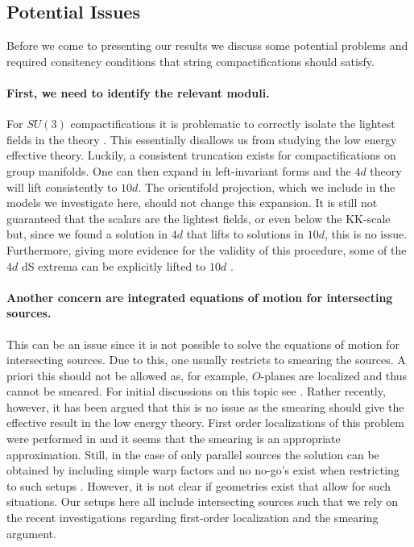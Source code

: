 \documentclass[12pt]{report}
\begin{document}
\subsection{Potential Issues}
\label{sec:stringrequ}
Before we come to presenting our results we discuss some potential problems and required consitency conditions that string compactifications should satisfy.
\paragraph{First, we need to identify the relevant moduli.} For $SU(3)$ compactifications it is problematic to correctly isolate the lightest fields in the theory \cite{Kashani-Poor:2006ofe,Kashani-Poor:2007nby}. This essentially disallows us from studying the low energy effective theory. Luckily, a consistent truncation exists \cite{Cassani:2009ck} for compactifications on group manifolds. One can then expand in left-invariant forms and the $4d$ theory will lift consistently to $10d$. The orientifold projection, which we include in the models we investigate here, should not change this expansion. It is still not guaranteed that the scalars are the lightest fields, or even below the KK-scale \cite{Andriot:2018wzk} but, since we found a solution in $4d$ that lifts to solutions in $10d$, this is no issue. Furthermore, giving more evidence for the validity of this procedure, some of the $4d$ dS extrema can be explicitly lifted to $10d$ \cite{Danielsson:2010bc}.
\paragraph{Another concern are integrated equations of motion for intersecting sources.} This can be an issue since it is not possible to solve the equations of motion for intersecting sources. Due to this, one usually restricts to smearing the sources. A priori this should not be allowed as, for example, $O$-planes are localized and thus cannot be smeared. For initial discussions on this topic see \cite{Douglas:2010rt,Blaback:2010sj,Blaback:2011nz,Blaback:2011pn,Saracco:2012wc,McOrist:2012yc}. Rather recently, however, it has been argued that this is no issue as the smearing should give the effective result in the low energy theory. First order localizations of this problem were performed in \cite{Junghans:2020acz,Marchesano:2020qvg,Cribiori:2021djm} and it seems that the smearing is an appropriate approximation. Still, in the case of only parallel sources the solution can be obtained by including simple warp factors and no no-go's exist when restricting to such setups \cite{Andriot:2016xvq}. However, it is not clear if geometries exist that allow for such situations. Our setups here all include intersecting sources such that we rely on the recent investigations regarding first-order localization and the smearing argument. 
\end{document}
